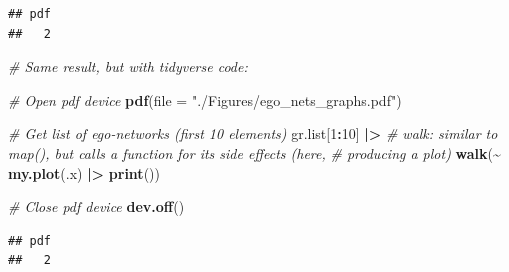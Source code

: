 \documentclass[
]{book}
\newenvironment{Shaded}{\begin{snugshade}}{\end{snugshade}}
\newcommand{\AttributeTok}[1]{\textcolor[rgb]{0.13,0.29,0.53}{#1}}
\newcommand{\CommentTok}[1]{\textcolor[rgb]{0.56,0.35,0.01}{\textit{#1}}}
\newcommand{\DecValTok}[1]{\textcolor[rgb]{0.00,0.00,0.81}{#1}}
\newcommand{\FunctionTok}[1]{\textcolor[rgb]{0.13,0.29,0.53}{\textbf{#1}}}
\newcommand{\NormalTok}[1]{#1}
\newcommand{\SpecialCharTok}[1]{\textcolor[rgb]{0.81,0.36,0.00}{\textbf{#1}}}
\newcommand{\StringTok}[1]{\textcolor[rgb]{0.31,0.60,0.02}{#1}}
\begin{document}
\begin{verbatim}
## pdf 
##   2
\end{verbatim}

\begin{Shaded}
\begin{Highlighting}[]
\CommentTok{\# Same result, but with tidyverse code:}

\CommentTok{\# Open pdf device}
\FunctionTok{pdf}\NormalTok{(}\AttributeTok{file =} \StringTok{"./Figures/ego\_nets\_graphs.pdf"}\NormalTok{)}

\CommentTok{\# Get list of ego{-}networks (first 10 elements)}
\NormalTok{gr.list[}\DecValTok{1}\SpecialCharTok{:}\DecValTok{10}\NormalTok{] }\SpecialCharTok{|\textgreater{}}
  \CommentTok{\# walk: similar to map(), but calls a function for its side effects (here,}
  \CommentTok{\# producing a plot)}
  \FunctionTok{walk}\NormalTok{(}\SpecialCharTok{\textasciitilde{}} \FunctionTok{my.plot}\NormalTok{(.x) }\SpecialCharTok{|\textgreater{}} \FunctionTok{print}\NormalTok{())}

\CommentTok{\# Close pdf device}
\FunctionTok{dev.off}\NormalTok{()}
\end{Highlighting}
\end{Shaded}

\begin{verbatim}
## pdf 
##   2
\end{verbatim}
\end{document}
